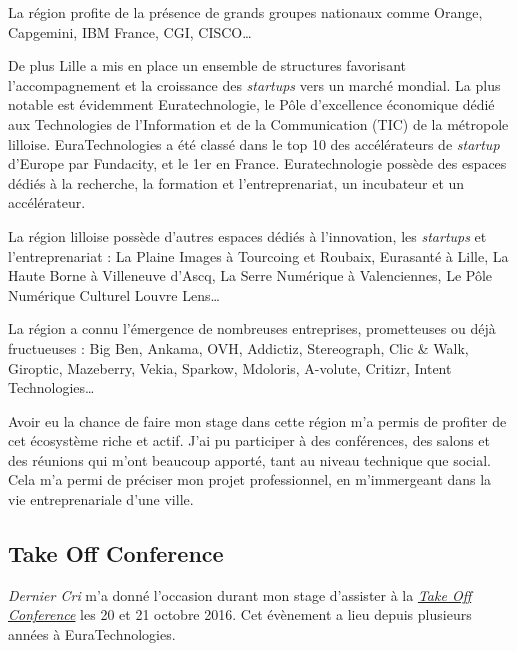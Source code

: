\bigskip

La région profite de la présence de grands groupes nationaux comme
Orange, Capgemini, IBM France, CGI, CISCO\ldots{}

\bigskip

De plus Lille a mis en place un ensemble de structures favorisant
l'accompagnement et la croissance des \emph{startups} vers un marché
mondial. La plus notable est évidemment Euratechnologie, le Pôle
d'excellence économique dédié aux Technologies de l'Information et de la
Communication (TIC) de la métropole lilloise. EuraTechnologies a été
classé dans le top 10 des accélérateurs de \emph{startup} d'Europe par
Fundacity, et le 1er en France. Euratechnologie possède des espaces
dédiés à la recherche, la formation et l'entreprenariat, un incubateur
et un accélérateur.

\bigskip

La région lilloise possède d'autres espaces dédiés à l'innovation, les
\emph{startups} et l'entreprenariat : La Plaine Images à Tourcoing et
Roubaix, Eurasanté à Lille, La Haute Borne à Villeneuve d'Ascq, La Serre
Numérique à Valenciennes, Le Pôle Numérique Culturel Louvre Lens\ldots{}

\bigskip

La région a connu l'émergence de nombreuses entreprises, prometteuses ou
déjà fructueuses : Big Ben, Ankama, OVH, Addictiz, Stereograph, Clic \&
Walk, Giroptic, Mazeberry, Vekia, Sparkow, Mdoloris, A-volute, Critizr,
Intent Technologies\ldots{}

\bigskip

Avoir eu la chance de faire mon stage dans cette région m'a permis de
profiter de cet écosystème riche et actif. J'ai pu participer à des
conférences, des salons et des réunions qui m'ont beaucoup apporté, tant
au niveau technique que social. Cela m'a permi de préciser mon projet
professionnel, en m'immergeant dans la vie entreprenariale d'une ville.

\bigskip

\subsection{Take Off Conference}\label{take-off-conference}

\bigskip

\emph{Dernier Cri} m'a donné l'occasion durant mon stage d'assister à la
\href{http://takeoffconf.com/2016}{\emph{Take Off Conference}} les 20 et
21 octobre 2016. Cet évènement a lieu depuis plusieurs années à
EuraTechnologies.

